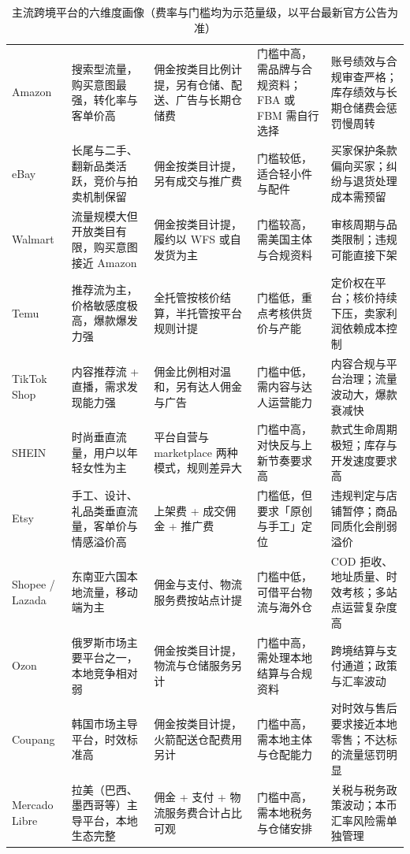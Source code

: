 \begin{table}[htbp]
\centering
\caption{主流跨境平台的六维度画像（费率与门槛均为示范量级，以平台最新官方公告为准）}
\label{tab:cbec-platforms}
\small
\begin{tabularx}{\textwidth}{L{2.0cm} L{2.2cm} L{2.4cm} L{2.4cm} Y}
\toprule
{} &  &  &  &  \\
\midrule
Amazon & 搜索型流量，购买意图最强，转化率与客单价高 & 佣金按类目比例计提，另有仓储、配送、广告与长期仓储费 & 门槛中高，需品牌与合规资料；FBA 或 FBM 需自行选择 & 账号绩效与合规审查严格；库存绩效与长期仓储费会惩罚慢周转 \\
\addlinespace
eBay & 长尾与二手、翻新品类活跃，竞价与拍卖机制保留 & 佣金按类目计提，另有成交与推广费 & 门槛较低，适合轻小件与配件 & 买家保护条款偏向买家；纠纷与退货处理成本需预留 \\
\addlinespace
Walmart & 流量规模大但开放类目有限，购买意图接近 Amazon & 佣金按类目计提，履约以 WFS 或自发货为主 & 门槛较高，需美国主体与合规资料 & 审核周期与品类限制；违规可能直接下架 \\
\addlinespace
Temu & 推荐流为主，价格敏感度极高，爆款爆发力强 & 全托管按核价结算，半托管按平台规则计提 & 门槛低，重点考核供货价与产能 & 定价权在平台；核价持续下压，卖家利润依赖成本控制 \\
\addlinespace
TikTok Shop & 内容推荐流 + 直播，需求发现能力强 & 佣金比例相对温和，另有达人佣金与广告 & 门槛中低，需内容与达人运营能力 & 内容合规与平台治理；流量波动大，爆款衰减快 \\
\addlinespace
SHEIN & 时尚垂直流量，用户以年轻女性为主 & 平台自营与 marketplace 两种模式，规则差异大 & 门槛中高，对快反与上新节奏要求高 & 款式生命周期极短；库存与开发速度要求高 \\
\addlinespace
Etsy & 手工、设计、礼品类垂直流量，客单价与情感溢价高 & 上架费 + 成交佣金 + 推广费 & 门槛低，但要求「原创与手工」定位 & 违规判定与店铺暂停；商品同质化会削弱溢价 \\
\addlinespace
Shopee / Lazada & 东南亚六国本地流量，移动端为主 & 佣金与支付、物流服务费按站点计提 & 门槛中低，可借平台物流与海外仓 & COD 拒收、地址质量、时效考核；多站点运营复杂度高 \\
\addlinespace
Ozon & 俄罗斯市场主要平台之一，本地竞争相对弱 & 佣金按类目计提，物流与仓储服务另计 & 门槛中高，需处理本地结算与合规资料 & 跨境结算与支付通道；政策与汇率波动 \\
\addlinespace
Coupang & 韩国市场主导平台，时效标准高 & 佣金按类目计提，火箭配送仓配费用另计 & 门槛中高，需本地主体与仓配能力 & 对时效与售后要求接近本地零售；不达标的流量惩罚明显 \\
\addlinespace
Mercado Libre & 拉美（巴西、墨西哥等）主导平台，本地生态完整 & 佣金 + 支付 + 物流服务费合计占比可观 & 门槛中高，需本地税务与仓储安排 & 关税与税务政策波动；本币汇率风险需单独管理 \\
\bottomrule
\end{tabularx}
\end{table}

